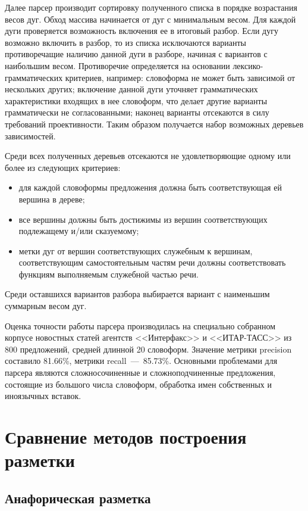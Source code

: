 Далее парсер производит сортировку полученного списка в порядке возрастания весов дуг. Обход массива начинается от дуг с минимальным весом. Для каждой дуги проверяется возможность включения ее в итоговый разбор. Если дугу возможно включить в разбор, то из списка исключаются варианты противоречащие наличию данной дуги в разборе, начиная с вариантов с наибольшим весом. Противоречие определяется на основании лексико-грамматических критериев, например: словоформа не может быть зависимой от нескольких других; включение данной дуги уточняет грамматических характеристики входящих в нее словоформ, что делает другие варианты грамматически не согласованными; наконец варианты отсекаются в силу требований проективности. Таким образом получается набор возможных деревьев зависимостей.

Среди всех полученных деревьев отсекаются не удовлетворяющие одному или более из следующих критериев:
\begin{itemize}
	\item для каждой словоформы предложения должна быть соответствующая ей вершина в дереве;
	\item все вершины должны быть достижимы из вершин соответствующих подлежащему и/или сказуемому;
	\item метки дуг от вершин соответствующих служебным к вершинам, соответствующим самостоятельным частям речи должны соответствовать функциям выполняемым служебной частью речи.
\end{itemize}
Среди оставшихся вариантов разбора выбирается вариант с наименьшим суммарным весом дуг.

Оценка точности работы парсера производилась на специально собранном корпусе новостных статей агентств <<Интерфакс>> и <<ИТАР-ТАСС>> из 800 предложений, средней длинной 20 словоформ. Значение метрики precision составило 81.66\%, метрики recall~---~85.73\%. Основными проблемами для парсера являются сложносочиненные и сложноподчиненные предложения, состоящие из большого числа словоформ, обработка имен собственных и иноязычных вставок.

\chapter{Сравнение методов построения разметки}
\section{Анафорическая разметка}
